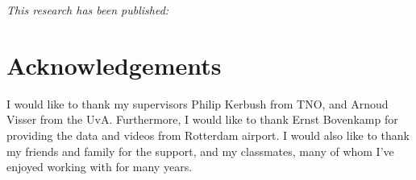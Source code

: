 \documentclass[11pt, a4paper]{book}
\begin{document}
\begingroup
\textit{This research has been published:} 
\renewcommand{\chapter}[2]{}
\endgroup
\graphicspath{{.}{../results}}


\listoftodos
\newpage
\section{Acknowledgements}
I would like to thank my supervisors Philip Kerbush from TNO, and Arnoud Visser from the UvA. Furthermore, I would like to thank Ernst Bovenkamp for providing the data and videos from Rotterdam airport. I would also like to thank my friends and family for the support, and my classmates, many of whom I've enjoyed working with for many years.
\newpage
\tableofcontents
\newpage

\mainmatter
\end{document}
